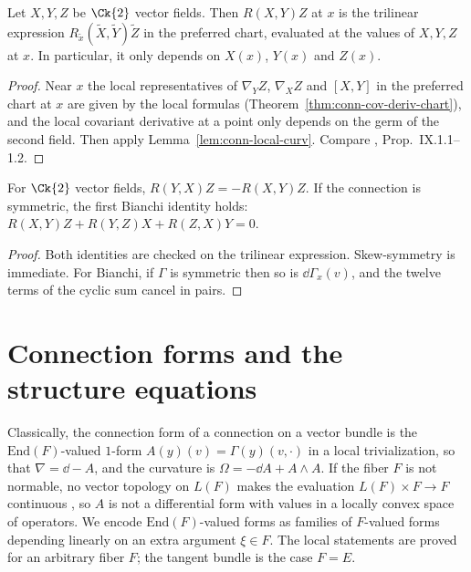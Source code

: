 \begin{theorem}
  \label{thm:conn-curvature-tensorial}
  \leanok
  Let $X, Y, Z$ be $\Ck{2}$ vector fields. Then $R(X, Y) Z$ at $x$ is the trilinear expression
  $R_{\tilde x}(\tilde X, \tilde Y)\tilde Z$ in the preferred chart, evaluated at the values of
  $X, Y, Z$ at $x$. In particular, it only depends on $X(x)$, $Y(x)$ and $Z(x)$.
\end{theorem}

\begin{proof}
  \leanok
  Near $x$ the local representatives of $\nabla_Y Z$, $\nabla_X Z$ and $[X, Y]$ in the preferred
  chart at $x$ are given by the local formulas (Theorem~\ref{thm:conn-cov-deriv-chart}), and the
  local covariant derivative at a point only depends on the germ of the second field. Then apply
  Lemma~\ref{lem:conn-local-curv}. Compare \cite{Lan99}, Prop.~IX.1.1--1.2.
\end{proof}

\begin{proposition}
  \label{prop:conn-curvature-symmetries}
  \leanok
  For $\Ck{2}$ vector fields, $R(Y, X) Z = -R(X, Y) Z$. If the connection is symmetric, the first
  Bianchi identity holds: $R(X, Y) Z + R(Y, Z) X + R(Z, X) Y = 0$.
\end{proposition}

\begin{proof}
  \leanok
  Both identities are checked on the trilinear expression. Skew-symmetry is immediate. For
  Bianchi, if $\Gamma$ is symmetric then so is $\dd\Gamma_x(v)$, and the twelve terms of the
  cyclic sum cancel in pairs.
\end{proof}

\section{Connection forms and the structure equations}
\label{sec:connection-forms}

Classically, the connection form of a connection on a vector bundle is the $\mathrm{End}(F)$-valued
$1$-form $A(y)(v) = \Gamma(y)(v, \cdot)$ in a local trivialization, so that $\nabla = \dd - A$, and
the curvature is $\Omega = -\dd A + A \wedge A$. If the fiber $F$ is not normable, no vector
topology on $L(F)$ makes the evaluation $L(F) \times F \to F$ continuous \cite[Satz 1]{Mai63}, so
$A$ is not a
differential form with values in a locally convex space of operators. We encode
$\mathrm{End}(F)$-valued forms as families of $F$-valued forms depending linearly on an extra
argument $\xi \in F$. The local statements are proved for an arbitrary fiber $F$; the tangent
bundle is the case $F = E$.

